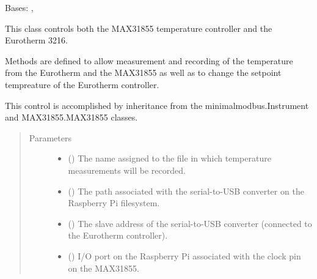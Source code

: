 \documentclass[letterpaper,10pt,english]{sphinxmanual}
\begin{document}
\begin{fulllineitems}
\label{\detokenize{vtipy_docs/vtipy:vtipy.temperature.temperature_controllers}}
Bases: , 

This class controls both the MAX31855 temperature controller
and the Eurotherm 3216.

Methods are defined to allow measurement and recording of the temperature
from the Eurotherm and the MAX31855 as well as to change the setpoint
tempreature of the Eurotherm controller.

This control is accomplished by inheritance from the
minimalmodbus.Instrument and MAX31855.MAX31855 classes.
\begin{quote}\begin{description}
\item[{Parameters}] \leavevmode\begin{itemize}
\item {} 
 () \textendash{} The name assigned to the file in which temperature measurements will be
recorded.

\item {} 
 () \textendash{} The path associated with the serial-to-USB converter on the Raspberry Pi
filesystem.

\item {} 
 (\sphinxstyleliteralemphasis{\sphinxupquote{, }}) \textendash{} The slave address of the serial-to-USB converter (connected to the
Eurotherm controller).

\item {} 
 (\sphinxstyleliteralemphasis{\sphinxupquote{, }}) \textendash{} I/O port on the Raspberry Pi associated with the clock pin on the
MAX31855.


\end{itemize}
\end{description}
\end{quote}
\end{fulllineitems}
\end{document}
